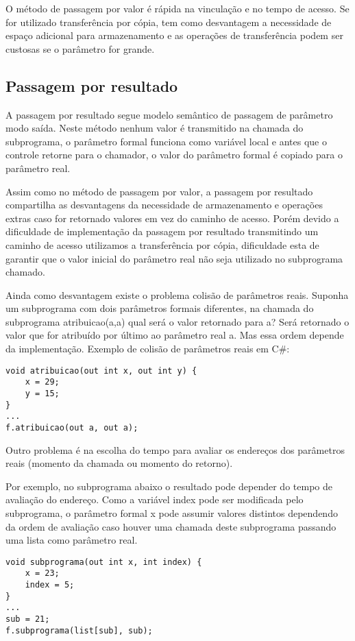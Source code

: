 O método de passagem por valor é rápida na vinculação e no tempo de acesso. Se for utilizado transferência por cópia, tem como desvantagem a necessidade de espaço adicional para armazenamento e as operações de transferência podem ser custosas se o parâmetro for grande.


\subsection{Passagem por resultado}
A passagem por resultado segue modelo semântico de passagem de parâmetro modo saída. Neste método nenhum valor é transmitido na chamada do subprograma, o parâmetro formal funciona como variável local e antes que o controle retorne para o chamador, o valor do parâmetro formal é copiado para o parâmetro real.

Assim como no método de passagem por valor, a passagem por resultado compartilha as desvantagens da necessidade de armazenamento e operações extras caso for retornado valores em vez do caminho de acesso. Porém devido a dificuldade de implementação da passagem por resultado transmitindo um caminho de acesso utilizamos a transferência por cópia, dificuldade esta de garantir que o valor inicial do parâmetro real não seja utilizado no subprograma chamado.

Ainda como desvantagem existe o problema colisão de parâmetros reais. Suponha um subprograma com dois parâmetros formais diferentes, na chamada do subprograma atribuicao(a,a) qual será o valor retornado para a? Será retornado o valor que for atribuído por último ao parâmetro real a. Mas essa ordem depende da implementação. Exemplo de colisão de parâmetros reais em C\#:

\begin{verbatim}
void atribuicao(out int x, out int y) {
    x = 29;
    y = 15;
}
...
f.atribuicao(out a, out a);
\end{verbatim}

Outro problema é na escolha do tempo para avaliar os endereços dos parâmetros reais (momento da chamada ou momento do retorno). 

Por exemplo, no subprograma abaixo o resultado pode depender do tempo de avaliação do endereço. Como a variável index pode ser modificada pelo subprograma, o parâmetro formal x pode assumir valores distintos dependendo da ordem de avaliação caso houver uma chamada deste subprograma passando uma lista como parâmetro real.

\begin{verbatim}
void subprograma(out int x, int index) {
    x = 23;
    index = 5;
}
...
sub = 21;
f.subprograma(list[sub], sub);
\end{verbatim}

